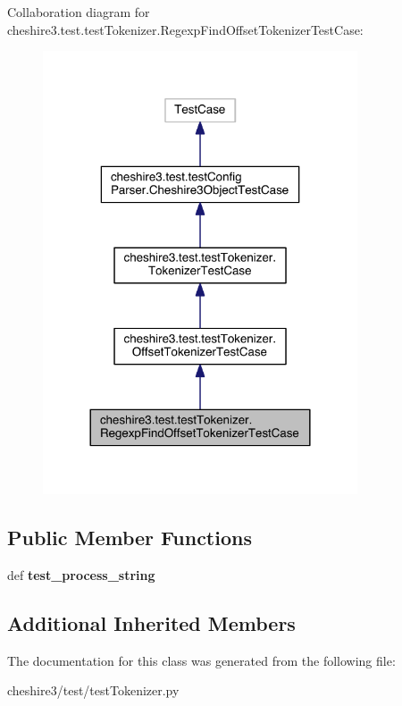 Collaboration diagram for cheshire3.\-test.\-test\-Tokenizer.\-Regexp\-Find\-Offset\-Tokenizer\-Test\-Case\-:
\nopagebreak
\begin{figure}[H]
\begin{center}
\leavevmode
\includegraphics[width=264pt]{classcheshire3_1_1test_1_1test_tokenizer_1_1_regexp_find_offset_tokenizer_test_case__coll__graph}
\end{center}
\end{figure}
\subsection*{Public Member Functions}
\begin{DoxyCompactItemize}
\item 
\hypertarget{classcheshire3_1_1test_1_1test_tokenizer_1_1_regexp_find_offset_tokenizer_test_case_a4bf7b7eb34b5551013e23fdbb107ddaf}{def {\bfseries test\-\_\-process\-\_\-string}}\label{classcheshire3_1_1test_1_1test_tokenizer_1_1_regexp_find_offset_tokenizer_test_case_a4bf7b7eb34b5551013e23fdbb107ddaf}

\end{DoxyCompactItemize}
\subsection*{Additional Inherited Members}


The documentation for this class was generated from the following file\-:\begin{DoxyCompactItemize}
\item 
cheshire3/test/test\-Tokenizer.\-py\end{DoxyCompactItemize}
